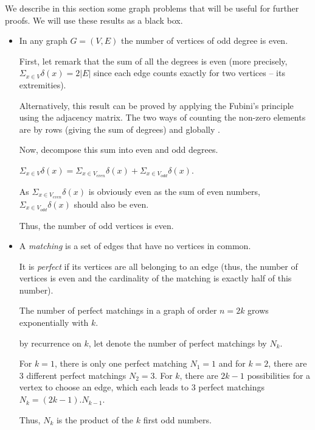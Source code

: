 We describe in this section some graph problems that will be useful for further proofs.
We will use these results as a black box. 

\begin{itemize}
\item
{} In any graph $G=(V,E)$ the number of vertices of odd degree is even.
\bigskip

First, let remark that the sum of all the degrees is even
(more precisely, $\Sigma_{x \in V} \delta(x) = 2 |E|$ since each edge counts exactly for two vertices -- its extremities). 

Alternatively, this result can be proved by applying the Fubini's principle using the adjacency matrix.
The two ways of counting the non-zero elements are by rows (giving the sum of degrees) and globally . 
\bigskip

Now, decompose this sum into even and odd degrees.

$\Sigma_{x \in V} \delta(x) = \Sigma_{x \in V_{even}} \delta(x) + \Sigma_{x \in V_{odd}} \delta(x)$.

As $\Sigma_{x \in V_{even}} \delta(x)$ is obviously even as the sum of even numbers, $\Sigma_{x \in V_{odd}} \delta(x)$ should also be even. 

Thus, the number of odd vertices is even.
\item
{}
A \textit{matching} is a set of edges that have no vertices in common.

It is \textit{perfect} if its vertices are all belonging to an edge (thus, the number of vertices is even 
and the cardinality of the matching is exactly half of this number).
\bigskip

The number of perfect matchings in a graph of order $n=2k$ grows exponentially with $k$.
\bigskip

by recurrence on $k$, let denote the number of perfect matchings by $N_k$.

For $k=1$, there is only one perfect matching 
$N_1=1$
and for $k=2$, there are $3$ different perfect matchings  
$N_2=3$.
For $k$, there are $2k-1$ possibilities for a vertex to choose an edge, which each leads to $3$ perfect matchings 
$N_k = (2k-1).N_{k-1}$. 

Thus, $N_k$ is the product of the $k$ first odd numbers. 


\end{itemize}
